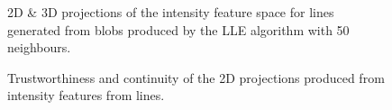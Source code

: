 \begin{figure}[H]
	\centering
	\caption{2D \& 3D projections of the intensity feature space for lines generated from blobs produced by the LLE algorithm with 50 neighbours.}\label{fig:intensity_LLE_mapping_lines}
\end{figure}
\clearpage


\clearpage
\begin{figure}[H]
	\centering
	\caption{Trustworthiness and continuity of the 2D projections produced from intensity features from lines.}\label{fig:TC_2d_intensity}
\end{figure}


